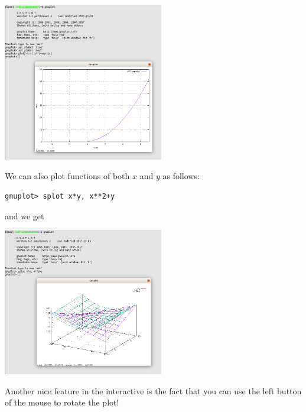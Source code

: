 \begin{center}
\includegraphics[width=7cm]{images/gnuplot/gnuplot2}
\end{center}
We can also plot functions of both $x$ and $y$ as follows:
\begin{mdframed}[backgroundcolor=gray!10]
\begin{verbatim}
gnuplot> splot x*y, x**2+y
\end{verbatim}
\end{mdframed}
and we get
\begin{center}
\includegraphics[width=7cm]{images/gnuplot/gnuplot3}
\end{center}

Another nice feature in the interactive is the fact that you can use the left button of the mouse
to rotate the plot! 

